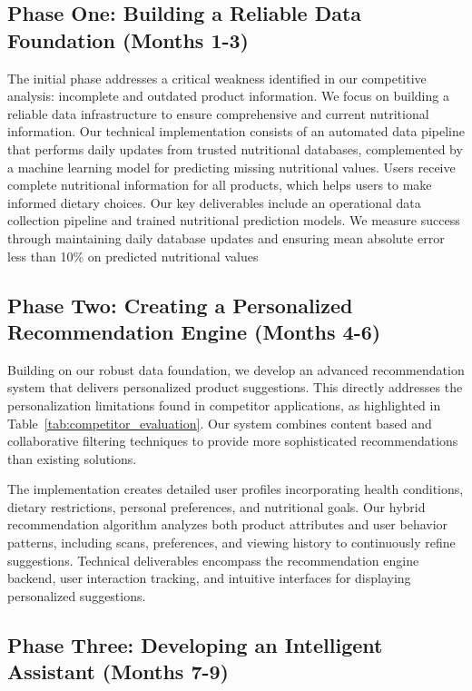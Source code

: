 \subsection{Phase One: Building a Reliable Data Foundation (Months 1-3)}

The initial phase addresses a critical weakness identified in our competitive analysis: incomplete and outdated product information. We focus on building a reliable data infrastructure to ensure comprehensive and current nutritional information. Our technical implementation consists of an automated data pipeline that performs daily updates from trusted nutritional databases, complemented by a machine learning model for predicting missing nutritional values. 
Users receive complete nutritional information for all products, which helps users to make informed dietary choices. Our key deliverables include an operational data collection pipeline and trained nutritional prediction models. We measure success through maintaining daily database updates and ensuring mean absolute error less than 10\% on predicted nutritional values

\subsection{Phase Two: Creating a Personalized Recommendation Engine (Months 4-6)}

Building on our robust data foundation, we develop an advanced recommendation system that delivers personalized product suggestions. 
This directly addresses the personalization limitations found in competitor applications, as highlighted in Table~\ref{tab:competitor_evaluation}. 
Our system combines content based and collaborative filtering techniques to provide more sophisticated recommendations than existing solutions.

The implementation creates detailed user profiles incorporating health conditions, dietary restrictions, personal preferences, and nutritional goals. Our hybrid recommendation algorithm analyzes both product attributes and user behavior patterns, including scans, preferences, and viewing history to continuously refine suggestions. Technical deliverables encompass the recommendation engine backend, user interaction tracking, and intuitive interfaces for displaying personalized suggestions.

\subsection{Phase Three: Developing an Intelligent Assistant (Months 7-9)}

